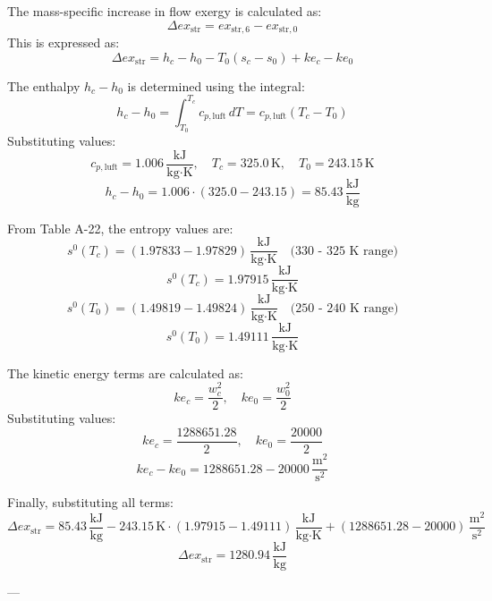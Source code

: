 The mass-specific increase in flow exergy is calculated as:  
\[
\Delta ex_{\text{str}} = ex_{\text{str},6} - ex_{\text{str},0}
\]  
This is expressed as:  
\[
\Delta ex_{\text{str}} = h_c - h_0 - T_0 (s_{c} - s_{0}) + ke_c - ke_0
\]  

The enthalpy \( h_c - h_0 \) is determined using the integral:  
\[
h_c - h_0 = \int_{T_0}^{T_c} c_{p,\text{luft}} \, dT = c_{p,\text{luft}} (T_c - T_0)
\]  
Substituting values:  
\[
c_{p,\text{luft}} = 1.006 \, \frac{\text{kJ}}{\text{kg·K}}, \quad T_c = 325.0 \, \text{K}, \quad T_0 = 243.15 \, \text{K}
\]  
\[
h_c - h_0 = 1.006 \cdot (325.0 - 243.15) = 85.43 \, \frac{\text{kJ}}{\text{kg}}
\]  

From Table A-22, the entropy values are:  
\[
s^0(T_c) = (1.97833 - 1.97829) \, \frac{\text{kJ}}{\text{kg·K}} \quad \text{(330 - 325 K range)}
\]  
\[
s^0(T_c) = 1.97915 \, \frac{\text{kJ}}{\text{kg·K}}
\]  
\[
s^0(T_0) = (1.49819 - 1.49824) \, \frac{\text{kJ}}{\text{kg·K}} \quad \text{(250 - 240 K range)}
\]  
\[
s^0(T_0) = 1.49111 \, \frac{\text{kJ}}{\text{kg·K}}
\]  

The kinetic energy terms are calculated as:  
\[
ke_c = \frac{w_c^2}{2}, \quad ke_0 = \frac{w_0^2}{2}
\]  
Substituting values:  
\[
ke_c = \frac{1288651.28}{2}, \quad ke_0 = \frac{20000}{2}
\]  
\[
ke_c - ke_0 = 1288651.28 - 20000 \, \frac{\text{m}^2}{\text{s}^2}
\]  

Finally, substituting all terms:  
\[
\Delta ex_{\text{str}} = 85.43 \, \frac{\text{kJ}}{\text{kg}} - 243.15 \, \text{K} \cdot (1.97915 - 1.49111) \, \frac{\text{kJ}}{\text{kg·K}} + (1288651.28 - 20000) \, \frac{\text{m}^2}{\text{s}^2}
\]  
\[
\Delta ex_{\text{str}} = 1280.94 \, \frac{\text{kJ}}{\text{kg}}
\]  

---
